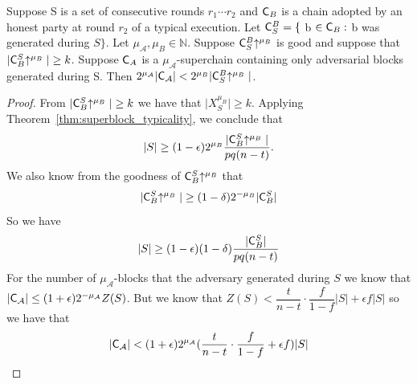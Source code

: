 \begin{lemma}
	Suppose S is a set of consecutive rounds $r_1 \cdots r_2$
	and $\mathsf{C}_B$ is a chain adopted by an honest party at round $r_2$ of a typical
	execution. Let $\mathsf{C}^{B}_{S} = \{$ b $\in \mathsf{C}_B:$ b was generated during $S\}$. Let
	$\mu_\mathcal{A}, \mu_B \in \mathbb{N}$. Suppose $\mathsf{C}^{B}_{S}\negthickspace\uparrow^{\mu_B}$ is good and suppose that $\vert \mathsf{C}^S_B \negthickspace\uparrow^{\mu_B} \vert \geq k$.
	Suppose $\mathsf{C}_A$ is a $\mu_\mathcal{A}$-superchain containing only adversarial
	blocks generated during S. Then
	$2^{\mu_\mathcal{A}} \vert \mathsf{C}_\mathcal{A} \vert <  2^{\mu_B} \vert    \mathsf{C}^{B}_{S}\negthickspace\uparrow^{\mu_B}\vert $.
	\label{lemma:honest_vs_pure_adversarial_subchain}
\end{lemma}
\begin{proof}
	From $\vert \mathsf{C}^S_B \negthickspace\uparrow^{\mu_B} \vert \geq k$ we have that $\vert X^{\mu_B}_S \vert \geq k$. 
	Applying Theorem~\ref{thm:superblock_typicality}, we conclude that  
	\begin{equation}\label{eq:honest_vs_pure_adversarial_subchain_eq1}
		\vert S \vert \geq (1-\epsilon)2^{\mu_B} \frac{\vert \mathsf{C}^S_B \negthickspace\uparrow^{\mu_B} \vert}{pq(n-t)}.
	\end{equation}
	We also know from the goodness of $\mathsf{C}_{B}^S \negthickspace\uparrow^{\mu_B}$
	that 
	\begin{equation}\label{eq:honest_vs_pure_adversarial_subchain_eq2}
		\vert \mathsf{C}_{B}^S \negthickspace\uparrow^{\mu_B} \vert \geq (1 - \delta)2^{-\mu_B} \vert	\mathsf{C}_{B}^S \vert
	\end{equation}
	So we have 
	\begin{equation}\label{eq:honest_vs_pure_adversarial_subchain_eq3}
		\lvert S \rvert \geq (1- \epsilon)(1- \delta) \dfrac{\lvert \mathsf{C}^S_B \rvert}{pq(n-t)}
	\end{equation}
	For the number of $\mu_\mathcal{A}$-blocks that the adversary generated during $S$ we know that $\lvert \mathsf{C}_\mathcal{A} \rvert \leq (1+\epsilon)2^{-\mu_\mathcal{A}} Z(S)$. But we know that $Z(S) < \dfrac{t}{n-t} \cdot \dfrac{f}{1-f} \lvert S \rvert + \epsilon f \lvert S \rvert $ so we have that 
	\begin{equation}\label{eq:honest_vs_pure_adversarial_subchain_eq4}
		\lvert \mathsf{C}_\mathcal{A} \rvert < (1+\epsilon)2^{\mu_\mathcal{A}}( \dfrac{t}{n-t} \cdot \dfrac{f}{1-f} + \epsilon f) \lvert S \rvert
	\end{equation}


\end{proof}
